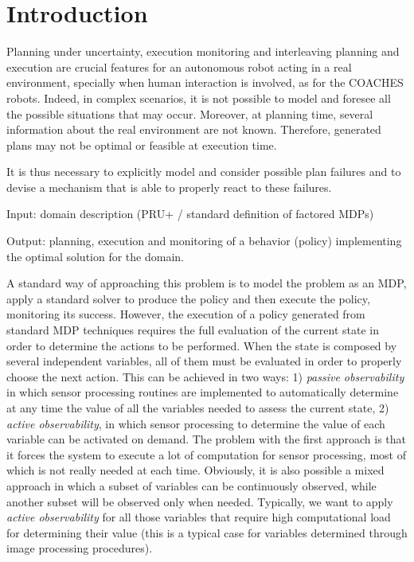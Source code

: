 \section{Introduction}



Planning under uncertainty, execution monitoring and interleaving planning and execution are crucial features for an autonomous robot acting in a real environment, specially when human interaction is involved, 
as for the COACHES robots. Indeed, in complex scenarios, it is not possible to model and foresee all the possible situations that may occur. Moreover, at planning time, several information about the real environment are not known. Therefore, generated plans may not be optimal or feasible at execution time.

It is thus necessary to explicitly model and consider possible plan failures and to devise a mechanism that is able to properly react to these failures.




Input: domain description  (PRU+ / standard definition of factored MDPs)

Output: planning, execution and monitoring of a behavior (policy) implementing the optimal solution for the domain.




A standard way of approaching this problem is to model the problem as an MDP, apply a standard solver to produce the policy and then execute the policy, monitoring its success.
However, the execution of a policy generated from standard MDP techniques requires the full evaluation of the current state in order to determine the actions to be performed. When the state is composed by several independent variables, all of them must be evaluated in order to properly choose the next action.
This can be achieved in two ways: 1) \emph{passive observability} in which sensor processing routines are implemented to automatically determine at any time the value of all the variables needed to assess the current state, 2) \emph{active observability}, in which sensor processing to determine the value of each variable can be activated on demand.
The problem with the first approach is that it forces the system to execute a lot of computation for sensor processing, most of which is not really needed at each time.
Obviously, it is also possible a mixed approach in which a subset of variables can be continuously observed, while another subset will be observed only when needed. Typically, we want to apply \emph{active observability} for all those variables that require high computational load for determining their value (this is a typical case for variables determined through image processing procedures).

